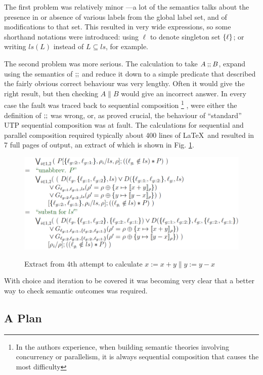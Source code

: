 The first problem was relatively minor
---a lot of the semantics talks about the presence in or absence of
various labels from the global label set, and of modifications to that set.
This resulted in very wide expressions,
so some shorthand notations were introduced:
using $\ell$ to denote singleton set $\{{\ell}\}$;
or writing $ls(L)$ instead of $L \subseteq ls$, for example.

The second problem was more serious.
The calculation to take $A \mathbin{\mathbf{;\!;}} B$, expand using the semantics of $\mathbin{\mathbf{;\!;}}$
and reduce it down to a simple predicate that described the fairly obvious
correct behaviour was very lengthy. Often it would give the right result,
but then checking $A \parallel B$ would give an incorrect answer.
In every case the fault was traced back to sequential composition%
\footnote{
In the authors experience,
when building semantic theories involving concurrency or parallelism,
it is always sequential composition that causes the most difficulty
}
,
were either the definition of $\mathbin{\mathbf{;\!;}}$ was wrong, or, as proved crucial,
the behaviour of ``standard'' UTP sequential composition
was at fault.
The calculations for sequential and parallel composition
required typically about 400 lines of \LaTeX\ and resulted
in 7 full pages of output,
an extract of which is shown in Fig. \ref{fig:attempt4}.

\begin{figure}
  \centering
  \includegraphics[width=6in]{Attempt4.eps}\\
  \caption{Extract from 4th attempt to calculate $x:=x+y \parallel y:=y-x$}
  \label{fig:attempt4}
\end{figure}

With choice and iteration to be covered
it was becoming very clear that a better way to check semantic outcomes
was required.

\subsection{A Plan}\label{ssec:plan}

